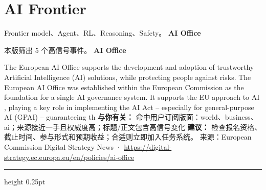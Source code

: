 \documentclass[10.5pt]{ctexart}
\begin{document}
\section*{AI Frontier}
{\color{ormuted} Frontier model、Agent、RL、Reasoning、Safety。}
\vspace{2mm}
{\LARGE\bfseries AI Office}\par
\vspace{1mm}
{\color{ormuted} 本版筛出 5 个高信号事件。}
\vspace{3mm}
{\Large\bfseries AI Office}\par
The European AI Office supports the development and adoption of trustworthy Artificial Intelligence (AI) solutions, while protecting people against risks. The European AI Office was established within the European Commission as the foundation for a single AI governance system. It supports the EU approach to AI , playing a key role in implementing the AI Act – especially for general-purpose AI (GPAI) – guaranteeing th
\textbf{与你有关：} 命中用户订阅版面：world、business、ai；来源接近一手且权威度高；标题/正文包含高信号变化
\textbf{建议：} 检查报名资格、截止时间、参与形式和预期收益；合适则立即加入任务系统。
{\footnotesize\color{ormuted} 来源：European Commission Digital Strategy News · \url{https://digital-strategy.ec.europa.eu/en/policies/ai-office}}
\vspace{4mm}
\hrule height 0.25pt
\vspace{3mm}
\end{document}
